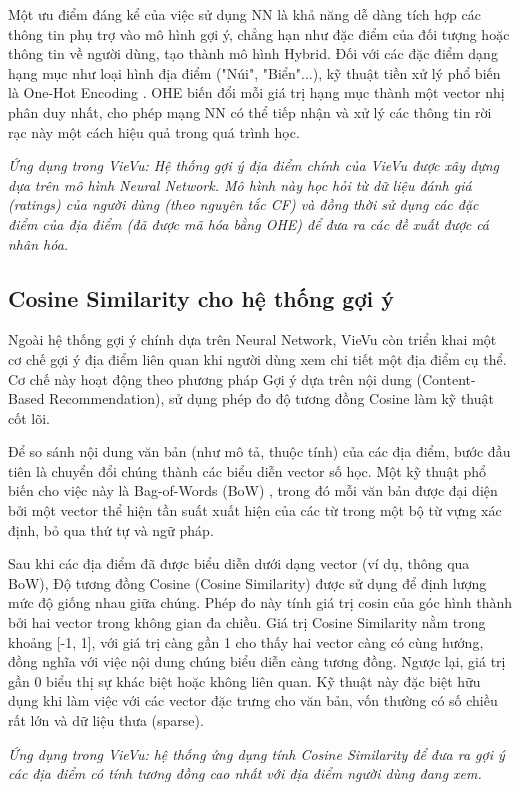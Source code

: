 Một ưu điểm đáng kể của việc sử dụng NN là khả năng dễ dàng tích hợp các thông tin phụ trợ vào mô hình gợi ý, chẳng hạn như đặc điểm của đối tượng hoặc thông tin về người dùng, tạo thành mô hình Hybrid. Đối với các đặc điểm dạng hạng mục như loại hình địa điểm ("Núi", "Biển"...), kỹ thuật tiền xử lý phổ biến là One-Hot Encoding  \cite{ohe_concept}. OHE biến đổi mỗi giá trị hạng mục thành một vector nhị phân duy nhất, cho phép mạng NN có thể tiếp nhận và xử lý các thông tin rời rạc này một cách hiệu quả trong quá trình học.

\textit{Ứng dụng trong VieVu: Hệ thống gợi ý địa điểm chính của VieVu được xây dựng dựa trên mô hình Neural Network. Mô hình này học hỏi từ dữ liệu đánh giá (ratings) của người dùng (theo nguyên tắc CF) và đồng thời sử dụng các đặc điểm của địa điểm (đã được mã hóa bằng OHE) để đưa ra các đề xuất được cá nhân hóa.}


\subsection{Cosine Similarity cho hệ thống gợi ý}



Ngoài hệ thống gợi ý chính dựa trên Neural Network, VieVu còn triển khai một cơ chế gợi ý địa điểm liên quan khi người dùng xem chi tiết một địa điểm cụ thể. Cơ chế này hoạt động theo phương pháp Gợi ý dựa trên nội dung (Content-Based Recommendation), sử dụng phép đo độ tương đồng Cosine làm kỹ thuật cốt lõi.

Để so sánh nội dung văn bản (như mô tả, thuộc tính) của các địa điểm, bước đầu tiên là chuyển đổi chúng thành các biểu diễn vector số học. Một kỹ thuật phổ biến cho việc này là Bag-of-Words (BoW) \cite{bow_concept}, trong đó mỗi văn bản được đại diện bởi một vector thể hiện tần suất xuất hiện của các từ trong một bộ từ vựng xác định, bỏ qua thứ tự và ngữ pháp.

Sau khi các địa điểm đã được biểu diễn dưới dạng vector (ví dụ, thông qua BoW), Độ tương đồng Cosine (Cosine Similarity) \cite{cosine_similarity_concept} được sử dụng để định lượng mức độ giống nhau giữa chúng. Phép đo này tính giá trị cosin của góc hình thành bởi hai vector trong không gian đa chiều. Giá trị Cosine Similarity nằm trong khoảng [-1, 1], với giá trị càng gần 1 cho thấy hai vector càng có cùng hướng, đồng nghĩa với việc nội dung chúng biểu diễn càng tương đồng. Ngược lại, giá trị gần 0 biểu thị sự khác biệt hoặc không liên quan. Kỹ thuật này đặc biệt hữu dụng khi làm việc với các vector đặc trưng cho văn bản, vốn thường có số chiều rất lớn và dữ liệu thưa (sparse).

\textit{Ứng dụng trong VieVu: hệ thống ứng dụng tính Cosine Similarity để đưa ra gợi ý các địa điểm có tính tương đồng cao nhất với địa điểm người dùng đang xem. }
